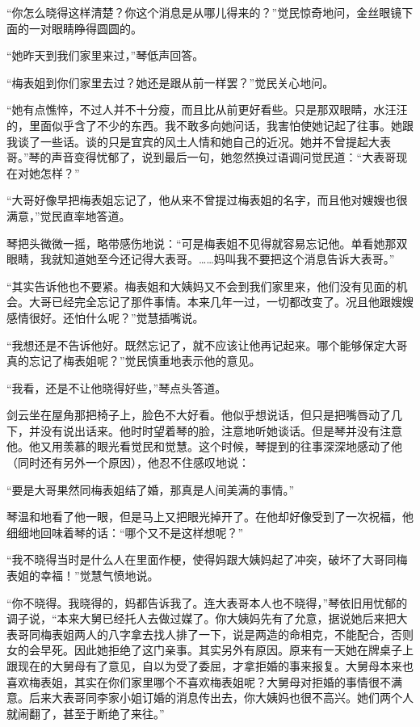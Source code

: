 \par “你怎么晓得这样清楚？你这个消息是从哪儿得来的？”觉民惊奇地问，金丝眼镜下面的一对眼睛睁得圆圆的。
\par “她昨天到我们家里来过，”琴低声回答。
\par “梅表姐到你们家里去过？她还是跟从前一样罢？”觉民关心地问。
\par “她有点憔悴，不过人并不十分瘦，而且比从前更好看些。只是那双眼睛，水汪汪的，里面似乎含了不少的东西。我不敢多向她问话，我害怕使她记起了往事。她跟我谈了一些话。谈的只是宜宾的风土人情和她自己的近况。她并不曾提起大表哥。”琴的声音变得忧郁了，说到最后一句，她忽然换过语调问觉民道：“大表哥现在对她怎样？”
\par “大哥好像早把梅表姐忘记了，他从来不曾提过梅表姐的名字，而且他对嫂嫂也很满意，”觉民直率地答道。
\par 琴把头微微一摇，略带感伤地说：“可是梅表姐不见得就容易忘记他。单看她那双眼睛，我就知道她至今还记得大表哥。……妈叫我不要把这个消息告诉大表哥。”
\par “其实告诉他也不要紧。梅表姐和大姨妈又不会到我们家里来，他们没有见面的机会。大哥已经完全忘记了那件事情。本来几年一过，一切都改变了。况且他跟嫂嫂感情很好。还怕什么呢？”觉慧插嘴说。
\par “我想还是不告诉他好。既然忘记了，就不应该让他再记起来。哪个能够保定大哥真的忘记了梅表姐呢？”觉民慎重地表示他的意见。
\par “我看，还是不让他晓得好些，”琴点头答道。
\par 剑云坐在屋角那把椅子上，脸色不大好看。他似乎想说话，但只是把嘴唇动了几下，并没有说出话来。他时时望着琴的脸，注意地听她谈话。但是琴并没有注意他。他又用羡慕的眼光看觉民和觉慧。这个时候，琴提到的往事深深地感动了他（同时还有另外一个原因），他忍不住感叹地说：
\par “要是大哥果然同梅表姐结了婚，那真是人间美满的事情。”
\par 琴温和地看了他一眼，但是马上又把眼光掉开了。在他却好像受到了一次祝福，他细细地回味着琴的话：“哪个又不是这样想呢？”
\par “我不晓得当时是什么人在里面作梗，使得妈跟大姨妈起了冲突，破坏了大哥同梅表姐的幸福！”觉慧气愤地说。
\par “你不晓得。我晓得的，妈都告诉我了。连大表哥本人也不晓得，”琴依旧用忧郁的调子说，“本来大舅已经托人去做过媒了。你大姨妈先有了允意，据说她后来把大表哥同梅表姐两人的八字拿去找人排了一下，说是两造的命相克，不能配合，否则女的会早死。因此她拒绝了这门亲事。其实另外有原因。原来有一天她在牌桌子上跟现在的大舅母有了意见，自以为受了委屈，才拿拒婚的事来报复。大舅母本来也喜欢梅表姐，其实在你们家里哪个不喜欢梅表姐呢？大舅母对拒婚的事情很不满意。后来大表哥同李家小姐订婚的消息传出去，你大姨妈也很不高兴。她们两个人就闹翻了，甚至于断绝了来往。”
